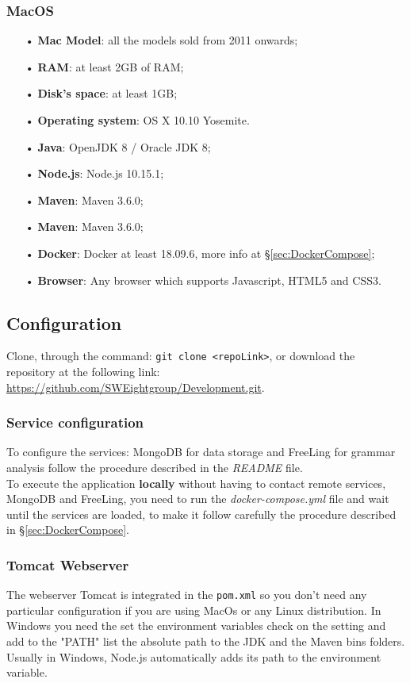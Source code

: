 \subsubsection{MacOS}
\begin{itemize}
\item [•]\textbf{Mac Model}: all the models sold from 2011 onwards;
\item [•]\textbf{RAM}: at least 2GB of RAM;
\item [•]\textbf{Disk’s space}: at least 1GB;
\item [•]\textbf{Operating system}: OS X 10.10 Yosemite.
\item [•]\textbf{Java}: OpenJDK 8 / Oracle JDK 8;
\item [•]\textbf{Node.js}: Node.js 10.15.1;
\item [•]\textbf{Maven}: Maven 3.6.0;
\item [•]\textbf{Maven}: Maven 3.6.0;
\item [•]\textbf{Docker}: Docker at least 18.09.6, more info at §\ref{sec:DockerCompose};  
\item [•]\textbf{Browser}: Any browser which supports Javascript, HTML5 and CSS3.
\end{itemize}

\subsection{Configuration}
Clone, through the command: \texttt{git clone <repoLink>}, or download the repository at the following link: \url{https://github.com/SWEightgroup/Development.git}.
\subsubsection{Service configuration}
To configure the services: MongoDB for data storage and FreeLing for grammar analysis follow the procedure described in the \textit{README} file.\\
To execute the application \textbf{locally} without having to contact remote services, MongoDB and FreeLing, you need to run the \textit{docker-compose.yml} file and wait until the services are loaded, to make it follow carefully the procedure described in §\ref{sec:DockerCompose}.
\subsubsection{Tomcat Webserver}
The webserver Tomcat is integrated in the \texttt{pom.xml} so you don't need any particular configuration if you are using MacOs or any Linux distribution.
In Windows you need the set the environment variables check on the setting and add to the "PATH" list the absolute path to the JDK and the Maven bins folders.
Usually in Windows, Node.js automatically adds its path to the environment variable.
	
